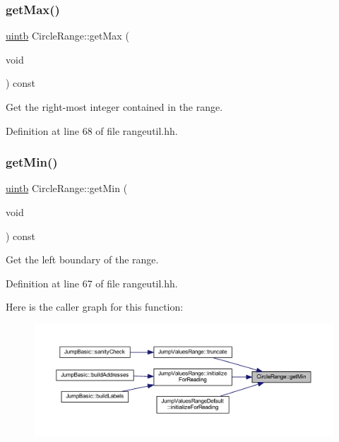 \subsubsection{\texorpdfstring{getMax()}{getMax()}}
{\footnotesize\ttfamily \mbox{\hyperlink{types_8h_a2db313c5d32a12b01d26ac9b3bca178f}{uintb}} Circle\+Range\+::get\+Max (\begin{DoxyParamCaption}\item[{void}]{ }\end{DoxyParamCaption}) const\hspace{0.3cm}{\ttfamily [inline]}}



Get the right-\/most integer contained in the range. 



Definition at line 68 of file rangeutil.\+hh.

\mbox{\label{class_circle_range_a4f3f3d4447720427b4a3e5c08da40a22}} 
\subsubsection{\texorpdfstring{getMin()}{getMin()}}
{\footnotesize\ttfamily \mbox{\hyperlink{types_8h_a2db313c5d32a12b01d26ac9b3bca178f}{uintb}} Circle\+Range\+::get\+Min (\begin{DoxyParamCaption}\item[{void}]{ }\end{DoxyParamCaption}) const\hspace{0.3cm}{\ttfamily [inline]}}



Get the left boundary of the range. 



Definition at line 67 of file rangeutil.\+hh.

Here is the caller graph for this function\+:
\nopagebreak
\begin{figure}[H]
\begin{center}
\leavevmode
\includegraphics[width=350pt]{class_circle_range_a4f3f3d4447720427b4a3e5c08da40a22_icgraph}
\end{center}
\end{figure}
\mbox{\label{class_circle_range_a761580f8aa6158005bf278654fc21cd1}} 

